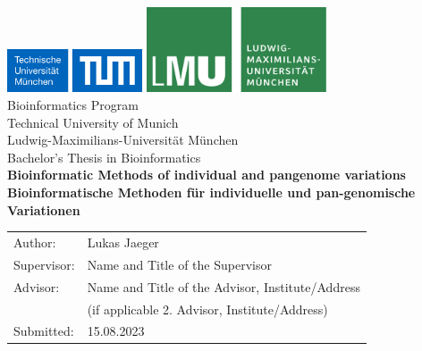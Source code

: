 \documentclass[a4paper,11pt,twoside,openright]{report}
\begin{document}
\begin{titlepage}
{\sffamily


\begin{center}
\includegraphics[width=0.3\textwidth]{pics/logo2}
\hfill
\includegraphics[width=0.4\textwidth]{pics/logo1}  
\\[3cm]  



{\Large Bioinformatics Program}\\[0.5cm]
{\Large Technical University of Munich}\\[0.5cm]
{\Large Ludwig-Maximilians-Universit\"at M\"unchen}\\[2cm]
{\Large Bachelor's Thesis in Bioinformatics}\\[2cm]
{\textbf{\LARGE Bioinformatic Methods of individual and pangenome variations}}\\[2cm]
{\textbf{\LARGE Bioinformatische Methoden für individuelle und pan-genomische Variationen}}\\[3cm]

\end{center}


\begin{center}\Large
  \begin{tabular}{ll}
    Author:& Lukas Jaeger\\
    Supervisor: &  Name and Title of the Supervisor\\
    Advisor:        &  Name and Title of the Advisor, Institute/Address\\
    & (if applicable 2. Advisor, Institute/Address)\\
    Submitted:     &  15.08.2023
  \end{tabular}
\end{center}



}%

\end{titlepage}


\lhead[\fancyplain{}{\thepage}]{\fancyplain{}{\rightmark}}
\rhead[\fancyplain{}{\leftmark}]{\fancyplain{}{\thepage}}
\cfoot{}
\end{document}
